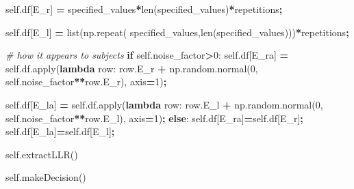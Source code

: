 \documentclass[12pt,twoside]{reedthesis}
\newenvironment{Shaded}{\begin{snugshade}}{\end{snugshade}}
\newcommand{\BuiltInTok}[1]{#1}
\newcommand{\CommentTok}[1]{\textcolor[rgb]{0.56,0.35,0.01}{\textit{#1}}}
\newcommand{\ControlFlowTok}[1]{\textcolor[rgb]{0.13,0.29,0.53}{\textbf{#1}}}
\newcommand{\DecValTok}[1]{\textcolor[rgb]{0.00,0.00,0.81}{#1}}
\newcommand{\KeywordTok}[1]{\textcolor[rgb]{0.13,0.29,0.53}{\textbf{#1}}}
\newcommand{\NormalTok}[1]{#1}
\newcommand{\OperatorTok}[1]{\textcolor[rgb]{0.81,0.36,0.00}{\textbf{#1}}}
\newcommand{\StringTok}[1]{\textcolor[rgb]{0.31,0.60,0.02}{#1}}
\newcommand{\VariableTok}[1]{\textcolor[rgb]{0.00,0.00,0.00}{#1}}
\begin{document}
\begin{Shaded}
\begin{Highlighting}[]
        \VariableTok{self}\NormalTok{.df[}\StringTok{\textquotesingle{}E\_r\textquotesingle{}}\NormalTok{] }\OperatorTok{=} 
\NormalTok{          specified\_values}\OperatorTok{*}\BuiltInTok{len}\NormalTok{(specified\_values)}\OperatorTok{*}\NormalTok{repetitions}\OperatorTok{;}
        
        \VariableTok{self}\NormalTok{.df[}\StringTok{\textquotesingle{}E\_l\textquotesingle{}}\NormalTok{] }\OperatorTok{=} \BuiltInTok{list}\NormalTok{(np.repeat(}
\NormalTok{            specified\_values,}\BuiltInTok{len}\NormalTok{(specified\_values)))}\OperatorTok{*}\NormalTok{repetitions}\OperatorTok{;}
        
        \CommentTok{\# how it appears to subjects}
        \ControlFlowTok{if} \VariableTok{self}\NormalTok{.noise\_factor}\OperatorTok{\textgreater{}}\DecValTok{0}\NormalTok{:}
          \VariableTok{self}\NormalTok{.df[}\StringTok{\textquotesingle{}E\_ra\textquotesingle{}}\NormalTok{] }\OperatorTok{=} \VariableTok{self}\NormalTok{.df.}\BuiltInTok{apply}\NormalTok{(}\KeywordTok{lambda}\NormalTok{ row: row.E\_r }\OperatorTok{+}
\NormalTok{                 np.random.normal(}\DecValTok{0}\NormalTok{, }\VariableTok{self}\NormalTok{.noise\_factor}\OperatorTok{**}\NormalTok{row.E\_r), }
\NormalTok{                 axis}\OperatorTok{=}\DecValTok{1}\NormalTok{)}\OperatorTok{;}

          \VariableTok{self}\NormalTok{.df[}\StringTok{\textquotesingle{}E\_la\textquotesingle{}}\NormalTok{] }\OperatorTok{=} \VariableTok{self}\NormalTok{.df.}\BuiltInTok{apply}\NormalTok{(}\KeywordTok{lambda}\NormalTok{ row: row.E\_l }\OperatorTok{+}
\NormalTok{                 np.random.normal(}\DecValTok{0}\NormalTok{, }\VariableTok{self}\NormalTok{.noise\_factor}\OperatorTok{**}\NormalTok{row.E\_l), }
\NormalTok{                 axis}\OperatorTok{=}\DecValTok{1}\NormalTok{)}\OperatorTok{;}
        \ControlFlowTok{else}\NormalTok{:}
          \VariableTok{self}\NormalTok{.df[}\StringTok{\textquotesingle{}E\_ra\textquotesingle{}}\NormalTok{]}\OperatorTok{=}\VariableTok{self}\NormalTok{.df[}\StringTok{\textquotesingle{}E\_r\textquotesingle{}}\NormalTok{]}\OperatorTok{;}
          \VariableTok{self}\NormalTok{.df[}\StringTok{\textquotesingle{}E\_la\textquotesingle{}}\NormalTok{]}\OperatorTok{=}\VariableTok{self}\NormalTok{.df[}\StringTok{\textquotesingle{}E\_l\textquotesingle{}}\NormalTok{]}\OperatorTok{;}

        \VariableTok{self}\NormalTok{.extractLLR()}

        \VariableTok{self}\NormalTok{.makeDecision()}


\end{Highlighting}
\end{Shaded}
\end{document}
